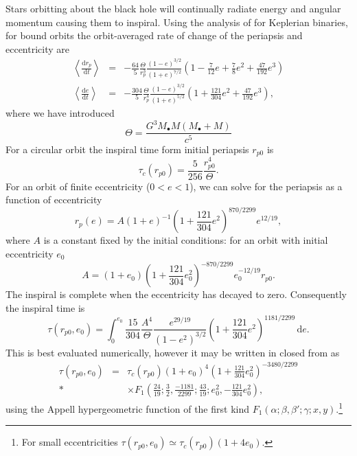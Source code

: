 \documentclass[useAMS,usedcolumn,usegraphicx,usenatbib]{mn2e}
\newcommand{\dd}{\ensuremath{\mathrm{d}}}
\newcommand{\diff}[2]{\ensuremath{\frac{\dd {#1}}{\dd {#2}}}}
\newcommand{\intd}[4]{\ensuremath{\int_{#1}^{#2}{#3}\,\dd{#4}}}
\begin{document}
Stars orbitting about the black hole will continually radiate energy and angular momentum causing them to inspiral. Using the analysis of \citet{Peters1964} for Keplerian binaries, for bound orbits the orbit-averaged rate of change of the periapsis and eccentricity are
\begin{eqnarray}
\left\langle\diff{r_p}{t}\right\rangle & = & -\frac{64}{5}\frac{\Theta}{r_p^3}\frac{(1 - e)^{3/2}}{(1 + e)^{7/2}}\left(1 - \frac{7}{12}e + \frac{7}{8}e^2 + \frac{47}{192}e^3\right) \\
\left\langle\diff{e}{t}\right\rangle & = & -\frac{304}{5}\frac{\Theta}{r_p^4}\frac{(1 - e)^{3/2}}{(1 + e)^{5/2}}\left(1 + \frac{121}{304}e^2 + \frac{47}{192}e^3\right),
\end{eqnarray}
where we have introduced
\begin{equation}
\Theta = \frac{G^3M_\bullet M(M_\bullet + M)}{c^5}
\end{equation}
For a circular orbit the inspiral time form initial periapsis $r_{p0}$ is
\begin{equation}
\tau_c(r_{p0}) = \frac{5}{256}\frac{r_{p0}^4}{\Theta}.
\end{equation}
For an orbit of finite eccentricity ($0 < e < 1$), we can solve for the periapsis as a function of eccentricity
\begin{equation}
r_p(e) = A(1 + e)^{-1}\left(1 + \frac{121}{304}e^2\right)^{870/2299}e^{12/19},
\end{equation}
where $A$ is a constant fixed by the initial conditions: for an orbit with initial eccentricity $e_0$
\begin{equation}
A = (1 + e_0)\left(1 + \frac{121}{304}e_0^2\right)^{-870/2299}e_0^{-12/19}r_{p0}.
\end{equation}
The inspiral is complete when the eccentricity has decayed to zero. Consequently the inspiral time is
\begin{equation}
\tau(r_{p0},e_0) = \intd{0}{e_0}{\frac{15}{304}\frac{A^4}{\Theta}\frac{e^{29/19}}{(1-e^2)^{3/2}}\left(1 + \frac{121}{304}e^2\right)^{1181/2299}}{e}.
\end{equation}
This is best evaluated numerically, however it may be written in closed from as
\begin{eqnarray}
\tau(r_{p0},e_0) & = & \tau_c(r_{p0})(1 + e_0)^4\left(1 + \frac{121}{304}e_0^2\right)^{-3480/2299}\\*
 & &  \times F_1\left(\frac{24}{19};\frac{3}{2},\frac{-1181}{2299};\frac{43}{19};e_0^2,-\frac{121}{304}e_0^2\right),
\end{eqnarray}
using the Appell hypergeometric function of the first kind $F_1(\alpha;\beta,\beta';\gamma;x,y)$.\footnote{For small eccentricities $\tau(r_{p0},e_0) \simeq \tau_c(r_{p0})(1 + 4e_0)$.}
\end{document}
